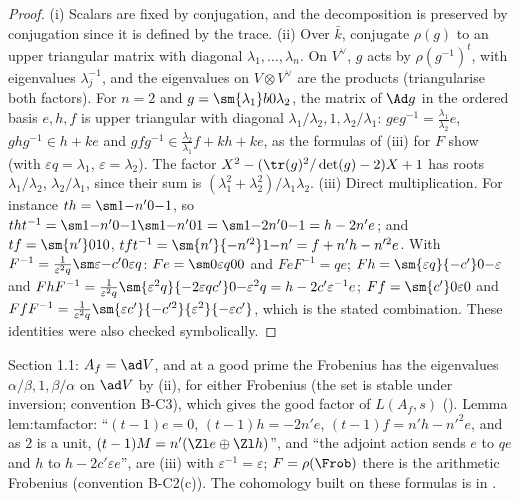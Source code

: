 \begin{proof}
(i) Scalars are fixed by conjugation, and the decomposition is preserved by conjugation since it is defined by the trace.
(ii) Over $\bar k$, conjugate $\rho(g)$ to an upper triangular matrix with diagonal $\lambda_1,\dots,\lambda_n$. On $V^\vee$, $g$ acts by $\rho(g^{-1})^t$, with eigenvalues
$\lambda_j^{-1}$, and the eigenvalues on $V\otimes V^\vee$ are the products (triangularise both factors). For $n=2$ and $g=\sm{\lambda_1}b0{\lambda_2}$, the matrix of
$\Ad g$ in the ordered basis $e,h,f$ is upper triangular with diagonal $\lambda_1/\lambda_2,1,\lambda_2/\lambda_1$: $geg^{-1}=\frac{\lambda_1}{\lambda_2}e$, $ghg^{-1}\in h+ke$ and
$gfg^{-1}\in\frac{\lambda_2}{\lambda_1}f+kh+ke$, as the formulas of (iii) for $F$ show (with $\varepsilon q=\lambda_1$, $\varepsilon=\lambda_2$). The factor $X^2-(\tr(g)^2/\det(g)-2)X+1$
has roots $\lambda_1/\lambda_2$, $\lambda_2/\lambda_1$, since their sum is $(\lambda_1^2+\lambda_2^2)/\lambda_1\lambda_2$.
(iii) Direct multiplication. For instance $th=\sm1{-n'}0{-1}$, so $tht^{-1}=\sm1{-n'}0{-1}\sm1{-n'}01=\sm1{-2n'}0{-1}=h-2n'e$; and
$tf=\sm{n'}010$, $tft^{-1}=\sm{n'}{-n'^2}1{-n'}=f+n'h-n'^2e$. With $F^{-1}=\frac1{\varepsilon^2q}\sm\varepsilon{-c'}0{\varepsilon q}$: $Fe=\sm0{\varepsilon q}00$ and $FeF^{-1}=qe$;
$Fh=\sm{\varepsilon q}{-c'}0{-\varepsilon}$ and $FhF^{-1}=\frac1{\varepsilon^2q}\sm{\varepsilon^2q}{-2\varepsilon qc'}0{-\varepsilon^2q}=h-2c'\varepsilon^{-1}e$; $Ff=\sm{c'}0\varepsilon0$ and
$FfF^{-1}=\frac1{\varepsilon^2q}\sm{\varepsilon c'}{-c'^2}{\varepsilon^2}{-\varepsilon c'}$, which is the stated combination. These identities were also checked symbolically.
\end{proof}

\begin{paperlink}
Section 1.1: $A_f=\ad V$, and at a good prime the Frobenius has the eigenvalues $\alpha/\beta,1,\beta/\alpha$ on $\ad V$ by (ii), for either Frobenius
(the set is stable under inversion; convention B-C3), which gives the good factor of $L(A_f,s)$ (). Lemma lem:tamfactor:
``$(t-1)e=0$, $(t-1)h=-2n'e$, $(t-1)f=n'h-n'^2e$, and as $2$ is a unit, $(t-1)M=n'(\Zl e\oplus\Zl h)$'', and ``the adjoint action sends $e$ to $qe$
and $h$ to $h-2c'\varepsilon e$'', are (iii) with $\varepsilon^{-1}=\varepsilon$; $F=\rho(\Frob)$ there is the arithmetic Frobenius (convention B-C2(c)). The
cohomology built on these formulas is in .
\end{paperlink}

